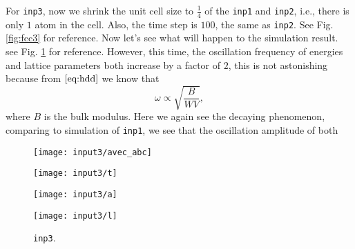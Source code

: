 For \texttt{inp3}, now we shrink the unit cell size to $\frac{ 1 }{ 4 }$ of the
\texttt{inp1} and \texttt{inp2}, i.e., there is only $1$  atom in the
cell. Also, the time step is $100$, the same as \texttt{inp2}.
See Fig. \ref{fig:fcc3} for reference.
Now let's see what will happen to the simulation result. see Fig. \ref{fig:input3}
for reference.
However, this time, the oscillation frequency of energies and lattice parameters
both increase by a factor of $2$, this is not astonishing because from
$\eqref{eq:hdd}$ we know that
\begin{equation}
  \omega \propto \sqrt{
 \frac{ B }{ W V }
 },
\end{equation}
where $B$ is the bulk modulus.
Here we again see the decaying phenomenon,
comparing to simulation of \texttt{inp1}, we see that the oscillation amplitude of
both
\begin{figure}[H]
  \begin{minipage}[t]{0.45\textwidth}
    \texttt{[image: input3/avec\_abc]}
    \subcaption{}
    \label{fig:input3:avec_abc}
  \end{minipage}
  \hfil
  \begin{minipage}[t]{0.45\textwidth}
    \texttt{[image: input3/t]}
    \subcaption{}
    \label{fig:input3:t}
  \end{minipage}
  \hfil
  \vfill
  \begin{minipage}[t]{0.45\textwidth}
    \texttt{[image: input3/a]}
    \subcaption{}
    \label{fig:input3:a}
  \end{minipage}
  \hfil
  \begin{minipage}[t]{0.45\textwidth}
    \texttt{[image: input3/l]}
    \subcaption{}
    \label{fig:input3:l}
  \end{minipage}
  \caption{\texttt{inp3}.}
  \label{fig:input3}
\end{figure}
